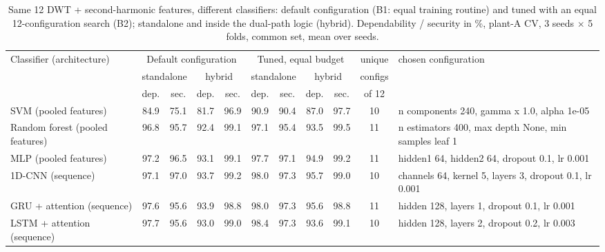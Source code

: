 \begin{table}[t]\centering
\caption{Same 12 DWT + second-harmonic features, different classifiers: default configuration (B1: equal training routine) and tuned with an equal 12-configuration search (B2); standalone and inside the dual-path logic (hybrid). Dependability / security in \%, plant-A CV, 3 seeds $\times$ 5 folds, common set, mean over seeds.}\label{tab:B_same_features}
\scriptsize\setlength{\tabcolsep}{3pt}
\begin{tabular}{@{}lcccccccccp{4.2cm}@{}}\toprule
Classifier (architecture) & \multicolumn{4}{c}{Default configuration} & \multicolumn{4}{c}{Tuned, equal budget} & unique & chosen configuration \\
& \multicolumn{2}{c}{standalone} & \multicolumn{2}{c}{hybrid} & \multicolumn{2}{c}{standalone} & \multicolumn{2}{c}{hybrid} & configs & \\
& dep. & sec. & dep. & sec. & dep. & sec. & dep. & sec. & of 12 & \\ \midrule
SVM (pooled features) & 84.9 & 75.1 & 81.7 & 96.9 & 90.9 & 90.4 & 87.0 & 97.7 & 10 & n components 240, gamma x 1.0, alpha 1e-05 \\
Random forest (pooled features) & 96.8 & 95.7 & 92.4 & 99.1 & 97.1 & 95.4 & 93.5 & 99.5 & 11 & n estimators 400, max depth None, min samples leaf 1 \\
MLP (pooled features) & 97.2 & 96.5 & 93.1 & 99.1 & 97.7 & 97.1 & 94.9 & 99.2 & 11 & hidden1 64, hidden2 64, dropout 0.1, lr 0.001 \\
1D-CNN (sequence) & 97.1 & 97.0 & 93.7 & 99.2 & 98.0 & 97.3 & 95.7 & 99.0 & 10 & channels 64, kernel 5, layers 3, dropout 0.1, lr 0.001 \\
GRU + attention (sequence) & 97.6 & 95.6 & 93.9 & 98.8 & 98.0 & 97.3 & 95.6 & 98.8 & 11 & hidden 128, layers 1, dropout 0.1, lr 0.001 \\
LSTM + attention (sequence) & 97.7 & 95.6 & 93.0 & 99.0 & 98.4 & 97.3 & 93.6 & 99.1 & 10 & hidden 128, layers 2, dropout 0.2, lr 0.003 \\
\bottomrule\end{tabular}

\end{table}

